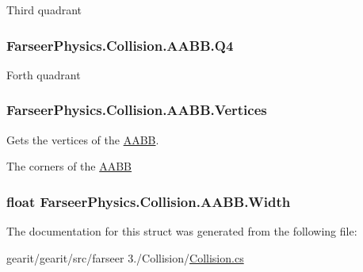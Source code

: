 Third quadrant 

\hypertarget{struct_farseer_physics_1_1_collision_1_1_a_a_b_b_a53e6c86a8bcda02bafcf080ba8a6a417}{
\subsubsection[{Q4}]{ Farseer\+Physics.\+Collision.\+A\+A\+B\+B.\+Q4\hspace{0.3cm}{\ttfamily [get]}}}\label{struct_farseer_physics_1_1_collision_1_1_a_a_b_b_a53e6c86a8bcda02bafcf080ba8a6a417}


Forth quadrant 

\hypertarget{struct_farseer_physics_1_1_collision_1_1_a_a_b_b_abc026b85181ffb46e9a4c38b517c2a19}{
\subsubsection[{Vertices}]{ Farseer\+Physics.\+Collision.\+A\+A\+B\+B.\+Vertices\hspace{0.3cm}{\ttfamily [get]}}}\label{struct_farseer_physics_1_1_collision_1_1_a_a_b_b_abc026b85181ffb46e9a4c38b517c2a19}


Gets the vertices of the \hyperlink{struct_farseer_physics_1_1_collision_1_1_a_a_b_b}{A\+A\+B\+B}. 

The corners of the \hyperlink{struct_farseer_physics_1_1_collision_1_1_a_a_b_b}{A\+A\+B\+B}\hypertarget{struct_farseer_physics_1_1_collision_1_1_a_a_b_b_ad123d853c488ddf9bf7538e77e0a5ee8}{
\subsubsection[{Width}]{\setlength{\rightskip}{0pt plus 5cm}float Farseer\+Physics.\+Collision.\+A\+A\+B\+B.\+Width\hspace{0.3cm}{\ttfamily [get]}}}\label{struct_farseer_physics_1_1_collision_1_1_a_a_b_b_ad123d853c488ddf9bf7538e77e0a5ee8}


The documentation for this struct was generated from the following file\+:\begin{DoxyCompactItemize}
\item 
gearit/gearit/src/farseer 3./\+Collision/\hyperlink{_collision_8cs}{Collision.\+cs}\end{DoxyCompactItemize}
